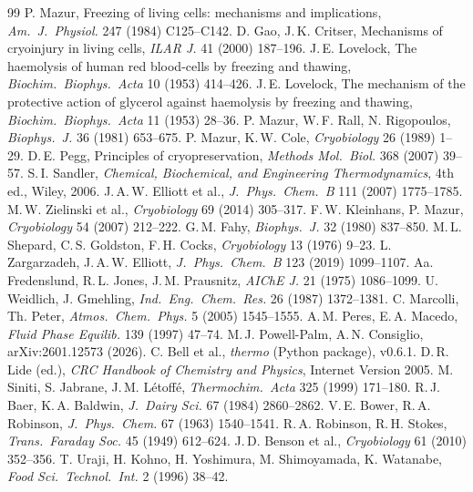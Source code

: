 \documentclass[11pt,a4paper]{article}
\begin{document}
\begin{thebibliography}{99}
\small
{} P. Mazur, Freezing of living cells: mechanisms and implications, \emph{Am.\ J.\ Physiol.} 247 (1984) C125--C142.
 D. Gao, J.\,K. Critser, Mechanisms of cryoinjury in living cells, \emph{ILAR J.} 41 (2000) 187--196.
 J.\,E. Lovelock, The haemolysis of human red blood-cells by freezing and thawing, \emph{Biochim.\ Biophys.\ Acta} 10 (1953) 414--426.
 J.\,E. Lovelock, The mechanism of the protective action of glycerol against haemolysis by freezing and thawing, \emph{Biochim.\ Biophys.\ Acta} 11 (1953) 28--36.
 P. Mazur, W.\,F. Rall, N. Rigopoulos, \emph{Biophys.\ J.} 36 (1981) 653--675.
 P. Mazur, K.\,W. Cole, \emph{Cryobiology} 26 (1989) 1--29.
 D.\,E. Pegg, Principles of cryopreservation, \emph{Methods Mol.\ Biol.} 368 (2007) 39--57.
 S.\,I. Sandler, \emph{Chemical, Biochemical, and Engineering Thermodynamics}, 4th ed., Wiley, 2006.
 J.\,A.\,W. Elliott et al., \emph{J.\ Phys.\ Chem.\ B} 111 (2007) 1775--1785.
 M.\,W. Zielinski et al., \emph{Cryobiology} 69 (2014) 305--317.
 F.\,W. Kleinhans, P. Mazur, \emph{Cryobiology} 54 (2007) 212--222.
 G.\,M. Fahy, \emph{Biophys.\ J.} 32 (1980) 837--850.
 M.\,L. Shepard, C.\,S. Goldston, F.\,H. Cocks, \emph{Cryobiology} 13 (1976) 9--23.
 L. Zargarzadeh, J.\,A.\,W. Elliott, \emph{J.\ Phys.\ Chem.\ B} 123 (2019) 1099--1107.
 Aa. Fredenslund, R.\,L. Jones, J.\,M. Prausnitz, \emph{AIChE J.} 21 (1975) 1086--1099.
 U. Weidlich, J. Gmehling, \emph{Ind.\ Eng.\ Chem.\ Res.} 26 (1987) 1372--1381.
 C. Marcolli, Th. Peter, \emph{Atmos.\ Chem.\ Phys.} 5 (2005) 1545--1555.
 A.\,M. Peres, E.\,A. Macedo, \emph{Fluid Phase Equilib.} 139 (1997) 47--74.
 M.\,J. Powell-Palm, A.\,N. Consiglio, arXiv:2601.12573 (2026).
 C. Bell et al., \emph{thermo} (Python package), v0.6.1.
 D.\,R. Lide (ed.), \emph{CRC Handbook of Chemistry and Physics}, Internet Version 2005.
 M. Siniti, S. Jabrane, J.\,M. L\'etoff\'e, \emph{Thermochim.\ Acta} 325 (1999) 171--180.
 R.\,J. Baer, K.\,A. Baldwin, \emph{J.\ Dairy Sci.} 67 (1984) 2860--2862.
 V.\,E. Bower, R.\,A. Robinson, \emph{J.\ Phys.\ Chem.} 67 (1963) 1540--1541.
 R.\,A. Robinson, R.\,H. Stokes, \emph{Trans.\ Faraday Soc.} 45 (1949) 612--624.
 J.\,D. Benson et al., \emph{Cryobiology} 61 (2010) 352--356.
 T. Uraji, H. Kohno, H. Yoshimura, M. Shimoyamada, K. Watanabe, \emph{Food Sci.\ Technol.\ Int.} 2 (1996) 38--42.
\end{thebibliography}
\end{document}
